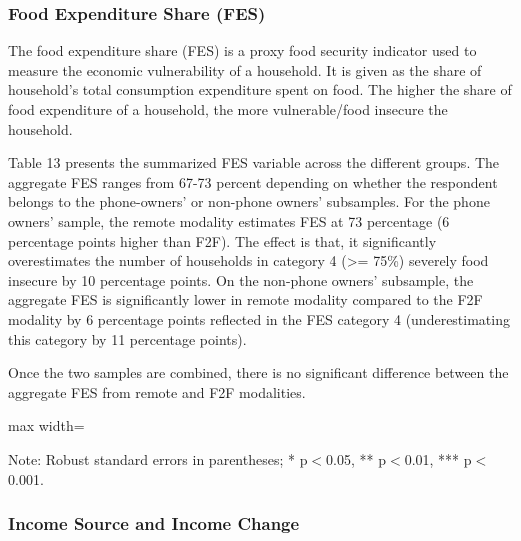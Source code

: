 \documentclass[11pt,harvard]{article}
\begin{document}
\subsubsection{Food Expenditure Share (FES)}
	
The food expenditure share (FES) is a proxy food security indicator used to measure the economic vulnerability of a household. It is given as the share of household's total consumption expenditure spent on food. The higher the share of food expenditure of a household, the more vulnerable/food insecure the household.

Table 13 presents the summarized FES variable across the different groups. The aggregate FES ranges from 67-73 percent depending on whether the respondent belongs to the phone-owners' or non-phone owners' subsamples. For the phone owners' sample, the remote modality estimates FES at 73  percentage (6 percentage points higher than F2F). The effect is that, it significantly overestimates the number of households in category 4 (>= 75\%) severely food insecure by 10 percentage points. On the non-phone owners' subsample, the aggregate FES is significantly lower in remote modality compared to the F2F modality by 6 percentage points reflected in the FES category 4 (underestimating this category by 11 percentage points).

Once the two samples are combined, there is no significant difference between the aggregate FES from remote and F2F modalities.  
	
	\begin{table}[htbp]
		\centering
		\begin{adjustbox}{max width=\textwidth}
			\begin{threeparttable}
				\caption{Impact of Survey Modality on Expenditure and Food Expenditure Share}
				\scriptsize
				 
				\label{tab:FES_Modality_CAR}
				\begin{tablenotes}
					\item Note: Robust standard errors in parentheses; * p$<$0.05, ** p$<$0.01, *** p$<$0.001.
				\end{tablenotes}
			\end{threeparttable}
		\end{adjustbox}
	\end{table}
	
	
\subsubsection{Income Source and Income Change}
\end{document}
